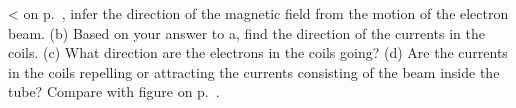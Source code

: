 <%
on p.~\pageref{fig:circular-orbit}, infer the direction of the magnetic field from
the motion of the electron beam. (b) Based on your answer to
a, find the direction of the currents in the coils. (c) What
direction are the electrons in the coils going? (d) Are the
currents in the coils repelling or attracting the currents
consisting of the beam inside the tube? Compare with
figure  on p.~\pageref{fig:magtwobody}.
